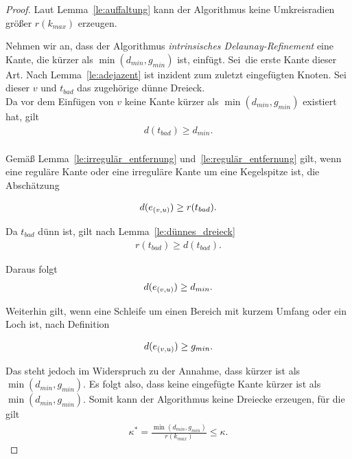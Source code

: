 \begin{proof}

Laut Lemma~\ref{le:auffaltung} kann der Algorithmus keine Umkreisradien größer $r(k_{max})$ erzeugen.

Nehmen wir an, dass der Algorithmus \textit{intrinsisches Delaunay-Refinement} eine Kante, die kürzer als $\min(d_{min}, g_{min} )$ ist, einfügt. Sei~\regulaereKante[(v,u)] die erste Kante dieser Art. Nach Lemma~\ref{le:adejazent} ist \regulaereKante[(v,u)] inzident zum zuletzt eingefügten Knoten. Sei dieser $v$ und $t_{bad}$ das zugehörige dünne Dreieck. \\

Da vor dem Einfügen von $v$ keine Kante kürzer als $\min(d_{min}, g_{min} )$ existiert hat, gilt  
\begin{align*}
    d(t_{bad}) \geq d_{min}.\\
\end{align*} 

Gemäß Lemma~\ref{le:irregulär_entfernung} und~\ref{le:regulär_entfernung} gilt, wenn \regulaereKante[(v,u)] eine reguläre Kante oder eine irreguläre Kante um eine Kegelspitze ist, die Abschätzung

\begin{align*}
    d(\regulaereKante*[(v,u)]) \geq r(t_{bad}).\\
\end{align*} 


Da $t_{bad}$ dünn ist, gilt nach Lemma~\ref{le:dünnes_dreieck} 
\begin{align*}
    r(t_{bad}) \geq d(t_{bad}).
\end{align*}


 Daraus folgt  
 \begin{align*}
     d(\regulaereKante*[(v,u)]) \geq d_{min}.
 \end{align*}

Weiterhin gilt, wenn \regulaereKante[(v,u)] eine Schleife um einen Bereich mit kurzem Umfang oder ein Loch ist, nach Definition

\begin{align*}
     d(\regulaereKante*[(v,u)]) \geq g_{min}.
 \end{align*}



Das steht jedoch im Widerspruch zu der Annahme, dass \regulaereKante[(v,u)] kürzer ist als $\min(d_{min}, g_{min} )$. Es folgt also, dass keine eingefügte Kante kürzer ist als $\min(d_{min}, g_{min} )$. Somit kann der Algorithmus keine Dreiecke erzeugen, für die gilt \\
 \begin{align*}
    \kappa^* = \frac{ \min(d_{min}, g_{min} )}{r(k_{max})} \leq \kappa.
 \end{align*}

\end{proof}

